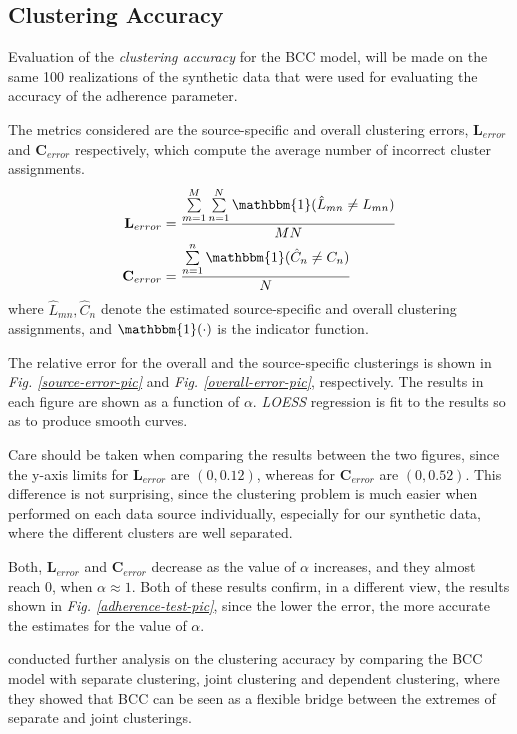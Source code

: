 \subsection{Clustering Accuracy} \label{integr-synth-cluster-sect}
Evaluation of the \emph{clustering accuracy} for the BCC model, will be made on the same 100 realizations of the synthetic data that were used for evaluating the accuracy of the adherence parameter.

The metrics considered are the source-specific and overall clustering errors, $\mathbf{L}_{error}$ and $\mathbf{C}_{error}$ respectively, which compute the average number of incorrect cluster assignments. 
\begin{equation}
  \begin{aligned}
  	\mathbf{L}_{error} & = \frac{\sum\limits_{m=1}^{M}\sum\limits_{n=1}^{N}\mathbbm{1}(\hat{L}_{mn} \neq L_{mn})}{MN} \\
  	\mathbf{C}_{error} & = \frac{\sum\limits_{n=1}^{n}\mathbbm{1}(\hat{C}_{n} \neq C_{n})}{N}
  \end{aligned}
\end{equation}
where $\hat{L}_{mn}, \hat{C}_{n}$ denote the estimated source-specific and overall clustering assignments, and $\mathbbm{1}(\cdot)$ is the indicator function.

The relative error for the overall and the source-specific clusterings is shown in \emph{Fig. \ref{source-error-pic}} and \emph{Fig. \ref{overall-error-pic}}, respectively. The results in each figure are shown as a function of $\alpha$. \emph{LOESS} regression \citep{Cleveland1979} is fit to the results so as to produce smooth curves. 

Care should be taken when comparing the results between the two figures, since the y-axis limits for $\mathbf{L}_{error}$ are $(0,0.12)$, whereas for $\mathbf{C}_{error}$ are $(0,0.52)$. This difference is not surprising, since the clustering problem is much easier when performed on each data source individually, especially for our synthetic data, where the different clusters are well separated. 

Both, $\mathbf{L}_{error}$ and $\mathbf{C}_{error}$ decrease as the value of $\alpha$ increases, and they almost reach 0, when $\alpha \approx 1$. Both of these results confirm, in a different view, the results shown in \emph{Fig. \ref{adherence-test-pic}}, since the lower the error, the more accurate the estimates for the value of $\alpha$.

\citet{Lock2013} conducted further analysis on the clustering accuracy by comparing the BCC model with separate clustering, joint clustering and dependent clustering, where they showed that BCC can be seen as a flexible bridge between the extremes of separate and joint clusterings.


